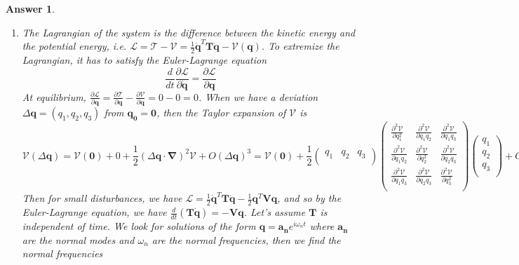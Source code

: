 \documentclass[a4paper]{article}
\newtheorem{ans}{Answer}[section]
\theoremstyle{new}
\begin{document}
\begin{ans}\leavevmode
\begin{enumerate}[label=(\roman*)]
\item The Lagrangian of the system is the difference between the kinetic energy and the potential energy, i.e. $\mathcal{L}=\mathcal{T}-\mathcal{V}=\frac{1}{2}\mathbf{\dot{q}}^T\mathbf{T}\mathbf{\dot{q}}-\mathcal{V}(\mathbf{q})$. To extremize the Lagrangian, it has to satisfy the Euler-Lagrange equation
$$\frac{d}{dt}\frac{\partial\mathcal{L}}{\partial\mathbf{\dot{q}}}=\frac{\partial\mathcal{L}}{\partial\mathbf{q}}$$
At equilibrium, $\frac{\partial\mathcal{L}}{\partial\mathbf{q}}=\frac{\partial\mathcal{T}}{\partial\mathbf{q}}-\frac{\partial\mathcal{V}}{\partial\mathbf{q}}=0-0=0$. When we have a deviation $\Delta\mathbf{q}=(q_1,q_2,q_3)$ from $\mathbf{q_0}=\boldsymbol{0}$, then the Taylor expansion of $\mathcal{V}$ is
$$\mathcal{V}(\Delta\mathbf{q})=\mathcal{V}(\boldsymbol{0})+0+\frac{1}{2}(\Delta\mathbf{q}\cdot\boldsymbol{\nabla})^2\mathcal{V}+O(\Delta\mathbf{q})^3=\mathcal{V}(\boldsymbol{0})+\frac{1}{2}\begin{pmatrix}q_1&q_2&q_3\\\end{pmatrix}\begin{pmatrix}\frac{\partial^2\mathcal{V}}{\partial q_1^2}&\frac{\partial^2\mathcal{V}}{\partial q_1q_2}&\frac{\partial^2\mathcal{V}}{\partial q_1q_3}\\\frac{\partial^2\mathcal{V}}{\partial q_1q_2}&\frac{\partial^2\mathcal{V}}{\partial q_2^2}&\frac{\partial^2\mathcal{V}}{\partial q_2q_3}\\\frac{\partial^2\mathcal{V}}{\partial q_1q_3}&\frac{\partial^2\mathcal{V}}{\partial q_2q_3}&\frac{\partial^2\mathcal{V}}{\partial q_3^2}\\\end{pmatrix}\begin{pmatrix}q_1\\q_2\\q_3\\\end{pmatrix}+O(\Delta\mathbf{q}^2)$$
Then for small disturbances, we have $\mathcal{L}=\frac{1}{2}\mathbf{\dot{q}}^T\mathbf{T}\mathbf{\dot{q}}-\frac{1}{2}\mathbf{q}^T\mathbf{V}\mathbf{q}$, and so by the Euler-Lagrange equation, we have $\frac{d}{dt}(\mathbf{T\dot{q}})=-\mathbf{Vq}$. Let's assume $\mathbf{T}$ is independent of time. We look for solutions of the form $\mathbf{q}=\mathbf{a_n}e^{i\omega_nt}$ where $\mathbf{a_n}$ are the normal modes and $\omega_n$ are the normal frequencies, then we find the normal frequencies

\end{enumerate}
\end{ans}
\end{document}
